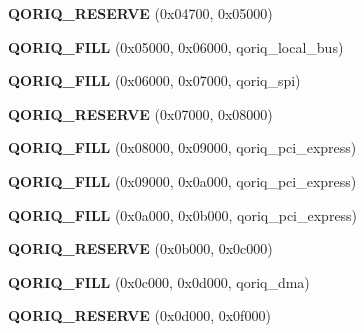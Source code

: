 \begin{DoxyCompactItemize}
\item 
\mbox{\label{structqoriq__ccsr_a5ad91100a92d18d4fa72400ed817373f}} 
{\bfseries Q\+O\+R\+I\+Q\+\_\+\+R\+E\+S\+E\+R\+VE} (0x04700, 0x05000)
\item 
\mbox{\label{structqoriq__ccsr_a5e13741d5b5d1757c1b3c81f2943ef9a}} 
{\bfseries Q\+O\+R\+I\+Q\+\_\+\+F\+I\+LL} (0x05000, 0x06000, qoriq\+\_\+local\+\_\+bus)
\item 
\mbox{\label{structqoriq__ccsr_a16a7d7e3761d4b85ba0c144ec6e13aca}} 
{\bfseries Q\+O\+R\+I\+Q\+\_\+\+F\+I\+LL} (0x06000, 0x07000, qoriq\+\_\+spi)
\item 
\mbox{\label{structqoriq__ccsr_a1adc3ea116c7f1b6ea4c2743cd125353}} 
{\bfseries Q\+O\+R\+I\+Q\+\_\+\+R\+E\+S\+E\+R\+VE} (0x07000, 0x08000)
\item 
\mbox{\label{structqoriq__ccsr_a8f0d2c16d613a45610a40375e660bb22}} 
{\bfseries Q\+O\+R\+I\+Q\+\_\+\+F\+I\+LL} (0x08000, 0x09000, qoriq\+\_\+pci\+\_\+express)
\item 
\mbox{\label{structqoriq__ccsr_a672d713ab198c87b217fac26019375ac}} 
{\bfseries Q\+O\+R\+I\+Q\+\_\+\+F\+I\+LL} (0x09000, 0x0a000, qoriq\+\_\+pci\+\_\+express)
\item 
\mbox{\label{structqoriq__ccsr_abd28845de47cafc84c3ef3c176da8364}} 
{\bfseries Q\+O\+R\+I\+Q\+\_\+\+F\+I\+LL} (0x0a000, 0x0b000, qoriq\+\_\+pci\+\_\+express)
\item 
\mbox{\label{structqoriq__ccsr_aebf763c18e092b975e93ad33fd154d83}} 
{\bfseries Q\+O\+R\+I\+Q\+\_\+\+R\+E\+S\+E\+R\+VE} (0x0b000, 0x0c000)
\item 
\mbox{\label{structqoriq__ccsr_a715e521f1b719ac3409ae466f4257af1}} 
{\bfseries Q\+O\+R\+I\+Q\+\_\+\+F\+I\+LL} (0x0c000, 0x0d000, qoriq\+\_\+dma)
\item 
\mbox{\label{structqoriq__ccsr_a9e2a0cd0649d8a630ab1950ea9c041db}} 
{\bfseries Q\+O\+R\+I\+Q\+\_\+\+R\+E\+S\+E\+R\+VE} (0x0d000, 0x0f000)
\item 

\end{DoxyCompactItemize}
